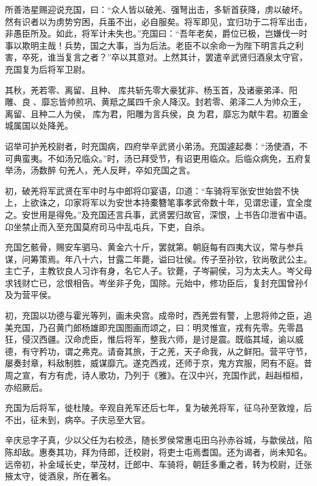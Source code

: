 \documentclass[12pt,UTF8]{ctexbook}
\begin{document}
所善浩星赐迎说充国，曰：“众人皆以破羌、强弩出击，多斩首获降，虏以破坏。然有识者以为虏势穷困，兵虽不出，必自服矣。将军即见，宜归功于二将军出击，非愚臣所及。如此，将军计未失也。”充国曰：“吾年老矣，爵位已极，岂嫌伐一时事以欺明主哉！兵势，国之大事，当为后法。老臣不以余命一为陛下明言兵之利害，卒死，谁当复言之者？”卒以其意对。上然其计，罢遣辛武贤归酒泉太守官，充国复为后将军卫尉。



其秋，羌若零、离留、且种、库共斩先零大豪犹非、杨玉首，及诸豪弟泽、阳雕、良、靡忘皆帅煎巩、黄羝之属四千余人降汉。封若零、弟泽二人为帅众王，离留、且种二人为侯，库为君，阳雕为言兵侯，良为君，靡忘为献牛君。初置金城属国以处降羌。



诏举可护羌校尉者，时充国病，四府举辛武贤小弟汤。充国遽起奏：“汤使酒，不可典蛮夷。不如汤兄临众。”时，汤已拜受节，有诏更用临众。后临众病免，五府复举汤，汤数醉句羌人，羌人反畔，卒如充国之言。



初，破羌将军武贤在军中时与中郎将卬宴语，卬道：“车骑将军张安世始尝不快上，上欲诛之，卬家将军以为安世本持橐簪笔事孝武帝数十年，见谓忠谨，宜全度之。安世用是得免。”及充国还言兵事，武贤罢归故官，深恨，上书告卬泄省中语。卬坐禁止而入至充国莫府司马中乱屯兵，下吏，自杀。



充国乞骸骨，赐安车驷马、黄金六十斤，罢就第。朝庭每有四夷大议，常与参兵谋，问筹策焉。年八十六，甘露二年薨，谥曰壮侯。传子至孙钦，钦尚敬武公主。主亡子，主教钦良人习诈有身，名它人子。钦薨，子岑嗣侯，习为太夫人。岑父母求钱财亡已，忿恨相告。岑坐非子免，国除。元始中，修功臣后，复封充国曾孙亻及为营平侯。



初，充国以功德与霍光等列，画未央宫。成帝时，西羌尝有警，上思将帅之臣，追美充国，乃召黄门郎杨雄即充国图画而颂之，曰：明灵惟宣，戎有先零。先零昌狂，侵汉西疆。汉命虎臣，惟后将军，整我六师，是讨是震。既临其域，谕以威德，有守矜功，谓之弗克。请奋其旅，于之羌，天子命我，从之鲜阳。营平守节，屡奏封章，料敌制胜，威谋靡亢。遂克西戎，还师于京，鬼方宾服，罔有不庭。昔周之宣，有方有虎，诗人歌功，乃列于《雅》。在汉中兴，充国作武，赳赳桓桓，亦绍厥后。



充国为后将军，徙杜陵。辛观自羌军还后七年，复为破羌将军，征乌孙至敦煌，后不出，征未到，病卒。子庆忌至大官。



辛庆忌字子真，少以父任为右校丞，随长罗侯常惠屯田乌孙赤谷城，与歙侯战，陷陈却敌。惠奏其功，拜为侍郎，迁校尉，将吏士屯焉耆国。还为谒者，尚未知名。远帝初，补金域长史，举茂材，迁郎中、车骑将，朝廷多重之者，转为校尉，迁张掖太守，徙酒泉，所在著名。
\end{document}
